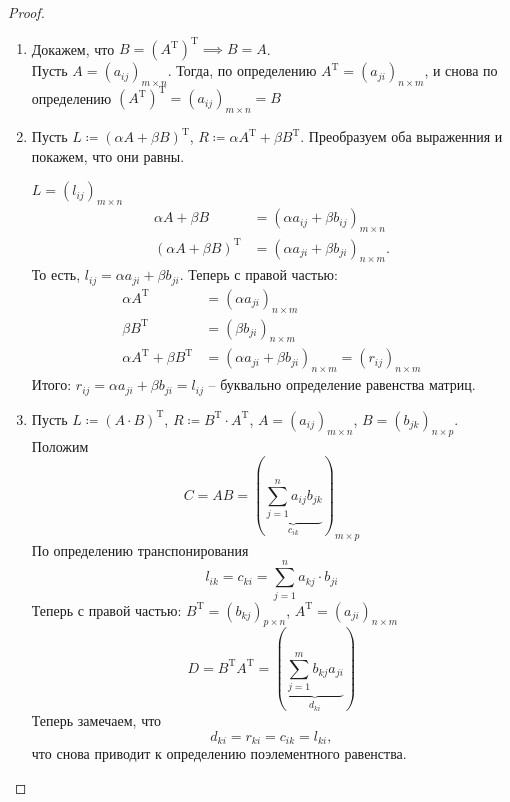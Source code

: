\documentclass[12pt, a4paper]{article}
\begin{document}
    \begin{proof}
        \(  \)
    \begin{enumerate}
        \item
            Докажем, что \( B = (A^{\mathrm T} ) ^{\mathrm T} \implies B = A  \). \\
            Пусть \( A = (a_{ij}) _{m \times n} \). Тогда, по определению \( A^{\mathrm T} = (a_{ji}) _{n\times m}  \), и снова по определению \( (A^{\mathrm T} )^{\mathrm T} = (a_{ij})_{m\times n} = B \)
        \item 
            Пусть \( L \coloneqq (\alpha A + \beta B)^{\mathrm T}  \), \( R \coloneqq \alpha A ^{\mathrm T} + \beta B^{\mathrm T} \). Преобразуем оба выраженния и покажем, что они равны.

            \( L = (l_{ij}) _{m \times n} \) 
            \begin{align*}
                \alpha A + \beta B &= (\alpha a_{ij} + \beta b_{ij})_{m \times n} \\
                (\alpha A + \beta B)^{\mathrm T} &= (\alpha a_{ji} + \beta b_{ji}) _{n\times m}.
            \end{align*} То есть, \( l_{ij} = \alpha a_{ji} + \beta b_{ji} \). Теперь с правой частью: 
            \begin{align*}
                \alpha A^{\mathrm T} & = (\alpha a_{ji})_{n\times m} \\
                \beta B^{\mathrm T} & = (\beta b_{ji}) _{n \times m} \\
                \alpha A ^{\mathrm T} + \beta B ^{\mathrm T} & = (\alpha a_{ji} + \beta b_{ji}) _{n \times m} = (r_{ij})_{n\times m}
            \end{align*}
            Итого: \( r_{ij} = \alpha a_{ji} + \beta b_{ji} = l_{ij} \) -- буквально определение равенства матриц.
        \item 
            Пусть \( L \coloneqq (A\cdot B)^{\mathrm T}  \), \( R \coloneqq B^{\mathrm T} \cdot A ^{\mathrm T}\), \( A = (a_{ij})_{m\times n} \), \( B = (b_{jk})_{n\times p} \). Положим \[
                C = AB = \left( \underbrace{\sum_{j=1}^{n} a_{ij} b_{jk}}_{c_{ik}} \right) _{m\times p}
            \] 
            По определению транспонирования \[
                l_{ik} = c_{ki} = \sum_{j=1}^{n} a_{kj}\cdot b_{ji}
            \] 
            Теперь с правой частью: \( B^{\mathrm T} = (b_{kj})_{p\times n}  \), \( A^{\mathrm T} = (a_{ji})_{n\times m}  \) \[
                D = B^{\mathrm T}A^{\mathrm T} = \left( \underbrace{\sum_{j=1}^{m} b_{kj} a_{ji}}_{d_{ki}} \right)   
            \] 
            Теперь замечаем, что \[
                d_{ki} = r_{ki} = c_{ik} = l_{ki},
            \] что снова приводит к определению поэлементного равенства.
            
    \end{enumerate}
    \end{proof}
\end{document}
